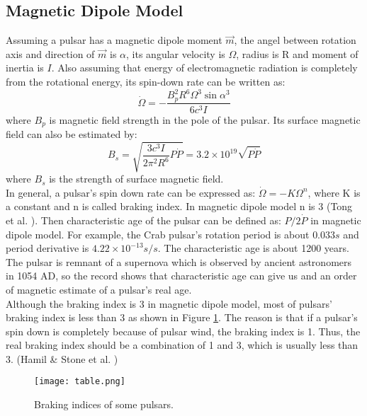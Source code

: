 \documentclass[12pt]{report}
\begin{document}
    \subsection{Magnetic Dipole Model}
      Assuming a pulsar has a magnetic dipole moment $\vec{m}$, the angel between rotation axis and 
      direction of 
      $\vec{m}$ is $\alpha$, its angular velocity is $\Omega$, radius is R and moment of inertia is $I$. 
      Also assuming that energy of electromagnetic radiation is completely from the rotational energy, 
      its spin-down rate can be written as: 
      $$
          \dot{\Omega}=-\frac{B_p^2 R^6 \Omega^3 \sin{\alpha}^3}{6c^3I}
      $$
      where $B_p$ is magnetic field strength in the pole of the pulsar. Its surface magnetic field can 
      also be estimated by:
      $$
          B_s=\sqrt{\frac{3c^3I}{2\pi^2R^6}P\dot{P}}=3.2\times 10^{19}\sqrt{P\dot{P}}
      $$
      where $B_s$ is the strength of surface magnetic field. \\
      \indent In general, a pulsar's spin down rate can be expressed as: $\dot{\Omega}=-K\Omega^{n}$, 
      where K is a constant and n is called braking index. In magnetic dipole model n is 
      3 (Tong et al. \cite{Tong2015}). Then characteristic age of the pulsar can be defined as: 
      $P/2\dot{P}$ in magnetic dipole model. For example, the Crab 
      pulsar's rotation period is about $0.033s$ and period derivative is 
      $4.22\times 10^{-13}s/s$. The characteristic age is about 1200 years. The pulsar 
      is remnant of a supernova which is observed by ancient astronomers in 1054 
      AD, so the record shows that characteristic age can give us and an order of magnetic 
      estimate of a pulsar's real age. \\
      \indent 
      Although the braking index is 3 in magnetic dipole model, most of pulsars' braking 
      index is less than 3 as shown in Figure \ref{fig:braking_index}. The reason is that if
      a pulsar's spin down is completely because of pulsar wind, the braking index is 1. 
      Thus, the real braking index should be a combination of 1 and 3, which is usually 
      less than 3. (Hamil \& Stone et al. \cite{PhysRevD.91.063007})
        
      \begin{figure}[!ht]
        \centering
        \texttt{[image: table.png]}
        \caption{Braking indices of some pulsars.}
        \label{fig:braking_index}
      \end{figure}
  
\end{document}

